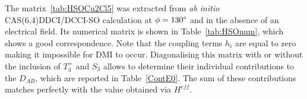 \documentclass[12pt]{report}
\numberwithin{equation}{section}
\begin{document}
\begin{table}[!ht]
    \centering
\caption{Numerical matrix of $\hat{H}^{SO}$ and electronic couplings in the uncoupled basis from a CAS(6,4)DDCI/DDCI-SO calculation with no electric field and $\phi=130\degree$.}
\label{tab:HSOnum}
\end{table}
The matrix~\ref{tab:HSOCu2Cl5} was extracted from \textit{ab initio} CAS(6,4)DDCI/DCCI-SO calculation at $\phi=130\degree$ and in the absence of an electrical field. Its numerical matrix is shown in Table~\ref{tab:HSOnum}, which shows a good correspondence. 
Note that the coupling terms $h_i$ are equal to zero making it impossible for DMI to occur.
Diagonalising this matrix with or without the inclusion of $T_3^+$ and $S_3$ allows to determine their individual contributions to the $D_{AB}$, which are reported in Table~\ref{ContE0}.
The sum of these contributions matches perfectly with the value obtained via $H^{eff}$.
\end{document}
